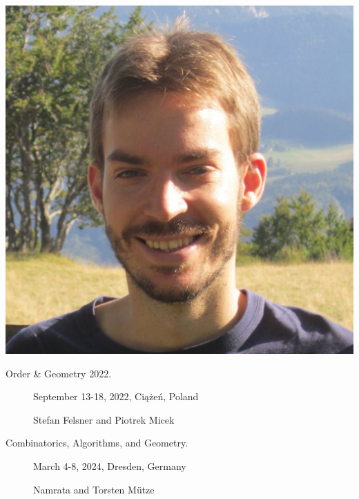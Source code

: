 \documentclass[11pt]{beamer}%
\begin{document}
\begin{frame}
\begin{center}
  \includegraphics[height=.3\textheight]{pilaud.jpg}
  \end{center}
  \begin{description}
  \item[Order \& Geometry 2022.] September 13-18, 2022, Ciążeń, Poland
    \item[] Stefan Felsner and Piotrek Micek
    \item[Combinatorics, Algorithms, and Geometry.] March 4-8, 2024, Dresden, Germany
    \item[] Namrata and Torsten M\"utze      
  \end{description}

\end{frame}
\end{document}
